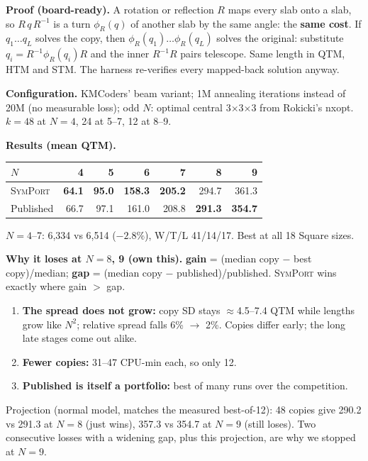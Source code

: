 \documentclass[10.5pt,a4paper]{article}
\newcommand{\Cu}[1]{#1$\times$#1$\times$#1}
\newcommand{\M}[1]{\textsc{#1}}
\newcommand{\sub}[1]{\par\smallskip\textbf{#1}\quad}
\begin{document}
\begin{keybox}
\textbf{Proof (board-ready).} A rotation or reflection $R$ maps every slab onto a slab, so $R\,q\,R^{-1}$ is a turn
$\phi_R(q)$ of another slab by the same angle: the \textbf{same cost}. If $q_1\ldots q_L$ solves the copy, then
$\phi_R(q_1)\ldots\phi_R(q_L)$ solves the original: substitute $q_i=R^{-1}\phi_R(q_i)R$ and the inner $R^{-1}R$ pairs
telescope. Same length in QTM, HTM and STM. The harness re-verifies every mapped-back solution anyway.
\end{keybox}

\sub{Configuration.} KMCoders' beam variant; 1M annealing iterations instead of 20M (no measurable loss); odd $N$: optimal
central \Cu{3} from Rokicki's nxopt. $k=48$ at $N=4$, 24 at 5--7, 12 at 8--9.
\sub{Results (mean QTM).}
\begin{center}\small
\begin{tabular}{@{}lrrrrrr@{}}
\toprule
$N$ & 4 & 5 & 6 & 7 & 8 & 9 \\
\midrule
\M{SymPort} & \textbf{64.1} & \textbf{95.0} & \textbf{158.3} & \textbf{205.2} & 294.7 & 361.3 \\
Published & 66.7 & 97.1 & 161.0 & 208.8 & \textbf{291.3} & \textbf{354.7} \\
\bottomrule
\end{tabular}
\end{center}
$N=4$--7: 6,334 vs 6,514 ($-2.8\%$), W/T/L 41/14/17. Best at all 18 Square sizes.

\sub{Why it loses at $N=8$, 9 (own this).} \textbf{gain} = (median copy $-$ best copy)/median; \textbf{gap} = (median copy $-$
published)/published. \M{SymPort} wins exactly where gain $>$ gap.
\begin{enumerate}
\item \textbf{The spread does not grow:} copy SD stays $\approx$4.5--7.4 QTM while lengths grow like $N^2$; relative spread
falls 6\% $\to$ 2\%. Copies differ early; the long late stages come out alike.
\item \textbf{Fewer copies:} 31--47 CPU-min each, so only 12.
\item \textbf{Published is itself a portfolio:} best of many runs over the competition.
\end{enumerate}
Projection (normal model, matches the measured best-of-12): 48 copies give 290.2 vs 291.3 at $N=8$ (just wins), 357.3 vs 354.7
at $N=9$ (still loses). Two consecutive losses with a widening gap, plus this projection, are why we stopped at $N=9$.
\end{document}

